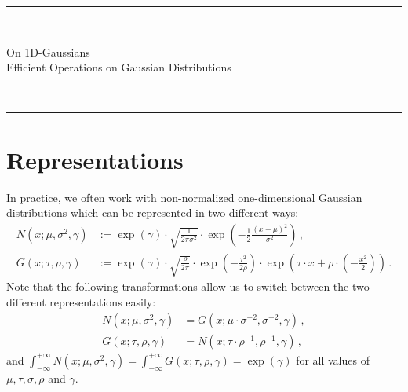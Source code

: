 \documentclass[a4paper]{article}
\begin{document}
\fancyhead[C]{}
\hrule \medskip
\begin{minipage}{0.295\textwidth}
    \raggedright
    \hfill\\
\end{minipage}
\begin{minipage}{0.4\textwidth}
    \centering
    \large
    On 1D-Gaussians\\
    \normalsize
    Efficient Operations on Gaussian Distributions\\
\end{minipage}
\begin{minipage}{0.295\textwidth}
    \raggedleft
    \hfill\\
\end{minipage}
\medskip\hrule
\bigskip


\section*{Representations}
In practice, we often work with non-normalized one-dimensional Gaussian distributions which can be represented in two different ways:
\begin{align}
    N(x;\mu,\sigma^2,\gamma) & := \exp(\gamma)\cdot \sqrt{\frac{1}{2\pi \sigma^2}} \cdot \exp\left(-\frac{1}{2}\frac{\left( x - \mu \right)^2}{\sigma^2}\right) \,,  \label{eq:n_def}                                       \\
    G(x;\tau,\rho,\gamma)    & := \exp(\gamma)\cdot \sqrt{\frac{\rho}{2\pi}} \cdot \exp\left(-\frac{\tau^2}{2\rho}\right) \cdot \exp\left(\tau \cdot x + \rho \cdot \left(-\frac{x^2}{2}\right)\right) \,. \label{eq:g_def}
\end{align}
Note that the following transformations allow us to switch between the two different representations easily:
\begin{align}
    N(x;\mu,\sigma^2,\gamma) & = G\left(x;\mu\cdot\sigma^{-2},\sigma^{-2},\gamma\right)\,,  \label{eq:from_N_to_G} \\
    G(x;\tau,\rho,\gamma)    & = N\left(x;\tau\cdot\rho^{-1},\rho^{-1},\gamma\right)\,,
\end{align}
and $\int_{-\infty}^{+\infty} N(x;\mu,\sigma^2,\gamma) = \int_{-\infty}^{+\infty} G(x;\tau,\rho,\gamma) = \exp(\gamma)$ for all values of $\mu, \tau, \sigma, \rho$ and $\gamma$.
\end{document}
